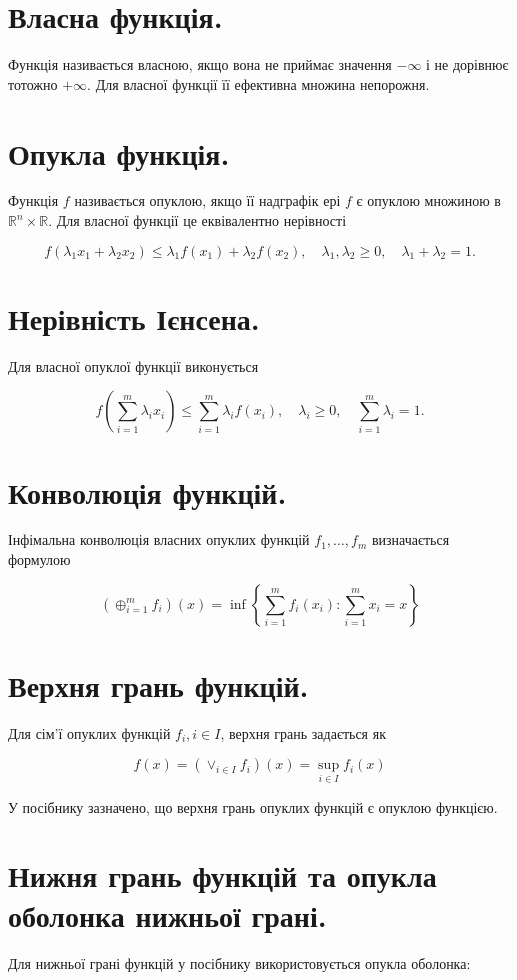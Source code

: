 \documentclass[10pt]{article}
\begin{document}
\captionsetup{singlelinecheck=false}
\section*{Власна функція.}
Функція називається власною, якщо вона не приймає значення $-\infty$ і не дорівнює тотожно $+\infty$. Для власної функції її ефективна множина непорожня.

\section*{Опукла функція.}
Функція $f$ називається опуклою, якщо її надграфік ері $f$ є опуклою множиною в $\mathbb{R}^{n} \times \mathbb{R}$. Для власної функції це еквівалентно нерівності

$$
f\left(\lambda_{1} x_{1}+\lambda_{2} x_{2}\right) \leq \lambda_{1} f\left(x_{1}\right)+\lambda_{2} f\left(x_{2}\right), \quad \lambda_{1}, \lambda_{2} \geq 0, \quad \lambda_{1}+\lambda_{2}=1 .
$$

\section*{Нерівність Ієнсена.}
Для власної опуклої функції виконується

$$
f\left(\sum_{i=1}^{m} \lambda_{i} x_{i}\right) \leq \sum_{i=1}^{m} \lambda_{i} f\left(x_{i}\right), \quad \lambda_{i} \geq 0, \quad \sum_{i=1}^{m} \lambda_{i}=1 .
$$

\section*{Конволюція функцій.}
Інфімальна конволюція власних опуклих функцій $f_{1}, \ldots, f_{m}$ визначається формулою

$$
\left(\oplus_{i=1}^{m} f_{i}\right)(x)=\inf \left\{\sum_{i=1}^{m} f_{i}\left(x_{i}\right): \sum_{i=1}^{m} x_{i}=x\right\}
$$

\section*{Верхня грань функцій.}
Для сім'ї опуклих функцій $f_{i}, i \in I$, верхня грань задається як

$$
f(x)=\left(\vee_{i \in I} f_{i}\right)(x)=\sup _{i \in I} f_{i}(x)
$$

У посібнику зазначено, що верхня грань опуклих функцій є опуклою функцією.

\section*{Нижня грань функцій та опукла оболонка нижньої грані.}
Для нижньої грані функцій у посібнику використовується опукла оболонка:
\end{document}
